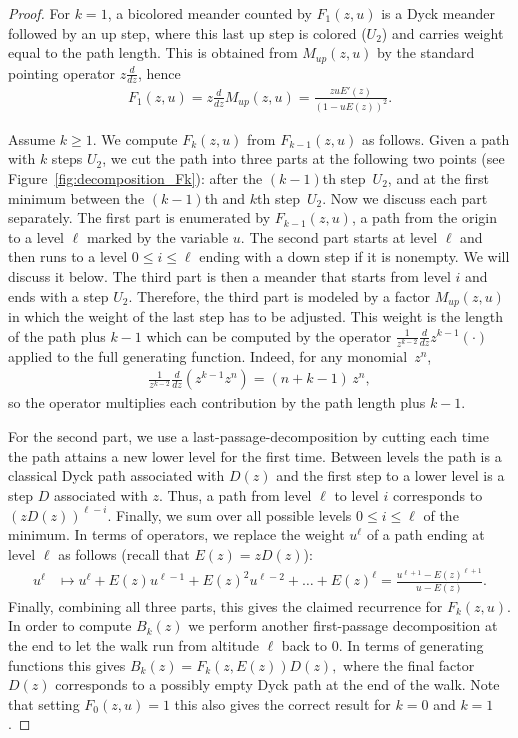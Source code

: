 \documentclass[10pt,a4paper]{amsart}
\newcommand{\Mup}{M_{up}}
\begin{document}
\begin{proof}
For $k=1$, a bicolored meander counted by $F_1(z,u)$ is a Dyck meander followed by an up step,
where this last up step is colored ($U_2$) and carries weight equal to the path length.
 This is obtained from $\Mup(z,u)$ by the standard pointing operator
$z\frac{d}{dz}$, hence
\begin{align}\label{eq:F1}
    F_1(z,u) 
        = z \frac{d}{dz} \Mup(z,u)
        = \frac{z uE'(z)}{(1-uE(z))^2}.
\end{align}

Assume $k\ge 1$. We compute $F_{k}(z,u)$ from $F_{k-1}(z,u)$ as follows.
Given a path with $k$ steps $U_2$, we cut the path into three parts at the following two points (see Figure~\ref{fig:decomposition_Fk}):
after the $(k-1)$th step~$U_2$, and at the first minimum between the $(k-1)$th and $k$th step~$U_2$.
Now we discuss each part separately. 
The first part is enumerated by $F_{k-1}(z,u)$, a path from the origin to a level $\ell$ marked by the variable $u$.
The second part starts at level $\ell$ and then runs to a level $0 \leq i \leq \ell$ ending with a down step if it is nonempty. 
We will discuss it below.
The third part is then a meander that starts from level $i$ and ends with a step $U_2$.
Therefore, the third part is modeled by a factor $\Mup(z,u)$ in which the weight of the last step has to be adjusted.
This weight is the length of the path plus $k-1$ which can be computed by the operator $\frac{1}{z^{k-2}}\frac{d}{dz} z^{k-1} (\cdot)$ applied to the full generating function. 
Indeed, for any monomial~$z^n$, 
\begin{align*}
\frac{1}{z^{k-2}}\frac{d}{dz}\!\left(z^{k-1}z^n\right) = (n+k-1)\,z^n,
\end{align*}
so the operator multiplies each contribution by the path length plus $k-1$.

For the second part, we use a last-passage-decomposition by cutting each time the path attains a new lower level for the first time.
Between levels the path is a classical Dyck path associated with $D(z)$ and the first step to a lower level is a step $D$ associated with $z$. 
Thus, a path from level $\ell$ to level $i$ corresponds to $(zD(z))^{\ell-i}$.
Finally, we sum over all possible levels $0 \leq i \leq \ell$ of the minimum.
In terms of operators, we replace the weight $u^{\ell}$ of a path ending at level $\ell$ as follows (recall that $E(z) = z D(z)$):
\begin{align*}
    u^{\ell} 
        &\mapsto u^{\ell} + E(z)u^{\ell-1} + E(z)^2 u^{\ell-2} + \dots + E(z)^{\ell} 
        =  \frac{u^{\ell+1} -  E(z)^{\ell+1}}{u -  E(z)}.
\end{align*}
Finally, combining all three parts, this gives the claimed recurrence for $F_{k}(z,u)$.
In order to compute $B_{k}(z)$ we perform another first-passage decomposition at the end to let the walk run from altitude $\ell$ back to $0$. 
In terms of generating functions this gives
$
    B_k(z) = F_{k}(z, E(z)) D(z),
$
where the final factor $D(z)$ corresponds to a possibly empty Dyck path at the end of the walk.
Note that setting $F_{0}(z,u)=1$ this also gives the correct result for $k=0$ and $k=1$.
\end{proof}
\end{document}
